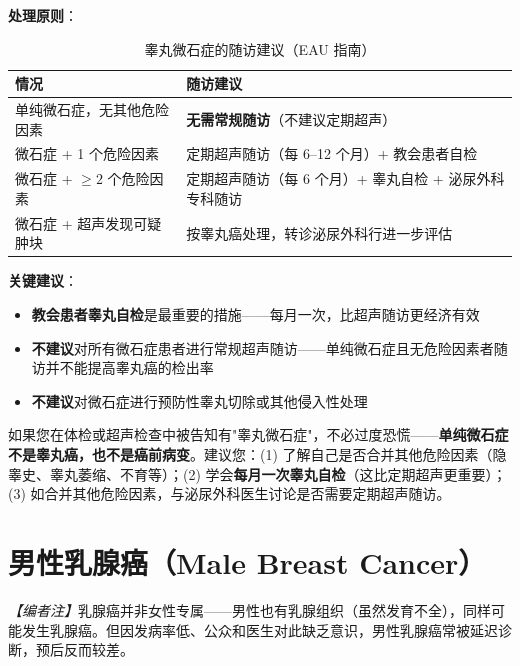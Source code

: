\vspace{0.5em}
\noindent\textbf{处理原则}：

\begin{table}[htbp]
\centering
\caption{睾丸微石症的随访建议（EAU 指南）}
\label{tab:microlithiasis_followup}
\begin{tabularx}{\textwidth}{@{}lX@{}}
    \toprule
    \textbf{情况} & \textbf{随访建议} \\
    \midrule
    单纯微石症，无其他危险因素 & \textbf{无需常规随访}（不建议定期超声） \\
    微石症 + 1 个危险因素 & 定期超声随访（每 6--12 个月）+ 教会患者自检 \\
    微石症 + $\geq 2$ 个危险因素 & 定期超声随访（每 6 个月）+ 睾丸自检 + 泌尿外科专科随访 \\
    微石症 + 超声发现可疑肿块 & 按睾丸癌处理，转诊泌尿外科行进一步评估 \\
    \bottomrule
\end{tabularx}
\end{table}

\vspace{0.5em}
\noindent\textbf{关键建议}：
\begin{itemize}[leftmargin=2cm]
	\item \textbf{教会患者睾丸自检}是最重要的措施——每月一次，比超声随访更经济有效
	\item \textbf{不建议}对所有微石症患者进行常规超声随访——单纯微石症且无危险因素者随访并不能提高睾丸癌的检出率
	\item \textbf{不建议}对微石症进行预防性睾丸切除或其他侵入性处理
\end{itemize}

\begin{tcolorbox}[colback=pink!5!white,colframe=red!50!black,title=贴心小叮咛]
如果您在体检或超声检查中被告知有"睾丸微石症"，不必过度恐慌——\textbf{单纯微石症不是睾丸癌，也不是癌前病变}。建议您：(1) 了解自己是否合并其他危险因素（隐睾史、睾丸萎缩、不育等）；(2) 学会\textbf{每月一次睾丸自检}（这比定期超声更重要）；(3) 如合并其他危险因素，与泌尿外科医生讨论是否需要定期超声随访。
\end{tcolorbox}

\section{男性乳腺癌（Male Breast Cancer）}
\label{sec:male_breast_cancer}

\noindent\textit{【编者注】}乳腺癌并非女性专属——男性也有乳腺组织（虽然发育不全），同样可能发生乳腺癌。但因发病率低、公众和医生对此缺乏意识，男性乳腺癌常被延迟诊断，预后反而较差。

